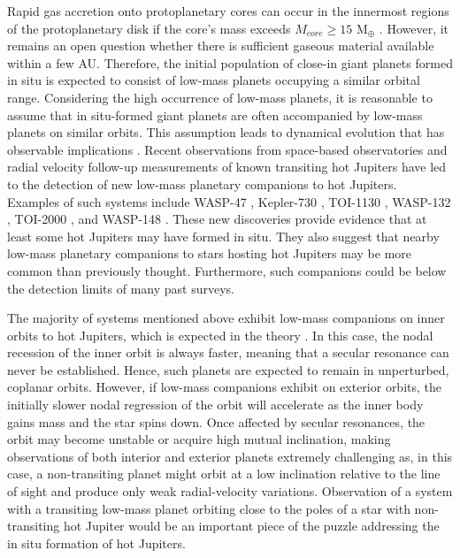 \documentclass[traditabstract,longauth]{aa}
\begin{document}
Rapid gas accretion onto protoplanetary cores can occur in the innermost regions of the protoplanetary disk if the core's mass exceeds $M_{core} \geq 15$ M$_{\oplus}$ \citep{Batygin16}. However, it remains an open question whether there is sufficient gaseous material available within a few AU. Therefore, the initial population of close-in giant planets formed in situ is expected to consist of low-mass planets occupying a similar orbital range. Considering the high occurrence of low-mass planets, it is reasonable to assume that in situ-formed giant planets are often accompanied by low-mass planets on similar orbits. This assumption leads to dynamical evolution that has observable implications \citep{Batygin16}. Recent observations from space-based observatories and radial velocity follow-up measurements of known transiting hot Jupiters have led to the detection of new low-mass planetary companions to hot Jupiters. Examples of such systems include WASP-47 \citep{Becker15}, Kepler-730 \citep{Canas19}, TOI-1130 \citep{Huang2020,Korth23}, WASP-132 \citep{Hord22}, TOI-2000 \citep{Sha23}, and WASP-148 \citep{Hebrard20}. These new discoveries provide evidence that at least some hot Jupiters may have formed in situ. They also suggest that nearby low-mass planetary companions to stars hosting hot Jupiters may be more common than previously thought. Furthermore, such companions could be below the detection limits of many past surveys.

The majority of systems mentioned above exhibit low-mass companions on inner orbits to hot Jupiters, which is expected in the theory \citep{Batygin16}. In this case, the nodal recession of the inner orbit is always faster, meaning that a secular resonance can never be established. Hence, such planets are expected to remain in unperturbed, coplanar orbits. However, if low-mass companions exhibit on exterior orbits, the initially slower nodal regression of the orbit will accelerate as the inner body gains mass and the star spins down. Once affected by secular resonances, the orbit may become unstable or acquire high mutual inclination, making observations of both interior and exterior planets extremely challenging as, in this case, a non-transiting planet might orbit at a low inclination relative to the line of sight and produce only weak radial-velocity variations. Observation of a system with a transiting low-mass planet orbiting close to the poles of a star with non-transiting hot Jupiter would be an important piece of the puzzle addressing the in situ formation of hot Jupiters.
\end{document}
